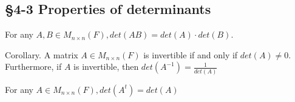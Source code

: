 				
		\begin{example}
		\end{example}
		
		\subsection*{\S 4-3 Properties of determinants}
		
		\begin{thm*}
			$ $\\
			For any $A,B \in M_{n \times n}(F), det(AB)=det(A)\cdot det(B)$.
		\end{thm*}
		
		Corollary. A matrix $A \in M_{n \times n}(F)$ is invertible if and only if $det(A) \neq 0$. Furthermore, if $A$ is invertible, then $det(A^{-1})=\frac{1}{det(A)}$
		
		\begin{thm*}
			$ $\\ For any $A \in M_{n \times n}(F), det(A^t)=det(A)$ 
		\end{thm*}
		
		
